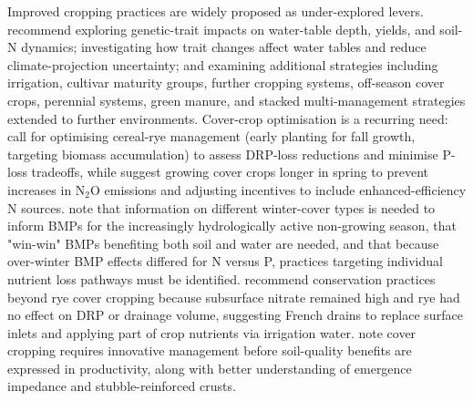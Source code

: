 \documentclass[11pt]{article}
\begin{document}
Improved cropping practices are widely proposed as under-explored levers. \textcite{Elli2023} recommend exploring genetic-trait impacts on water-table depth, yields, and soil-N dynamics; investigating how trait changes affect water tables and reduce climate-projection uncertainty; and examining additional strategies including irrigation, cultivar maturity groups, further cropping systems, off-season cover crops, perennial systems, green manure, and stacked multi-management strategies extended to further environments. Cover-crop optimisation is a recurring need: \textcite{deOliveira2022} call for optimising cereal-rye management (early planting for fall growth, targeting biomass accumulation) to assess DRP-loss reductions and minimise P-loss tradeoffs, while \textcite{PrezaFontes2023} suggest growing cover crops longer in spring to prevent increases in N$_2$O emissions and adjusting incentives to include enhanced-efficiency N sources. \textcite{McNeill2026} note that information on different winter-cover types is needed to inform BMPs for the increasingly hydrologically active non-growing season, that "win-win" BMPs benefiting both soil and water are needed, and that because over-winter BMP effects differed for N versus P, practices targeting individual nutrient loss pathways must be identified. \textcite{Krueger2013} recommend conservation practices beyond rye cover cropping because subsurface nitrate remained high and rye had no effect on DRP or drainage volume, suggesting French drains to replace surface inlets and applying part of crop nutrients via irrigation water. \textcite{Mitchell2000} note cover cropping requires innovative management before soil-quality benefits are expressed in productivity, along with better understanding of emergence impedance and stubble-reinforced crusts.
\end{document}
